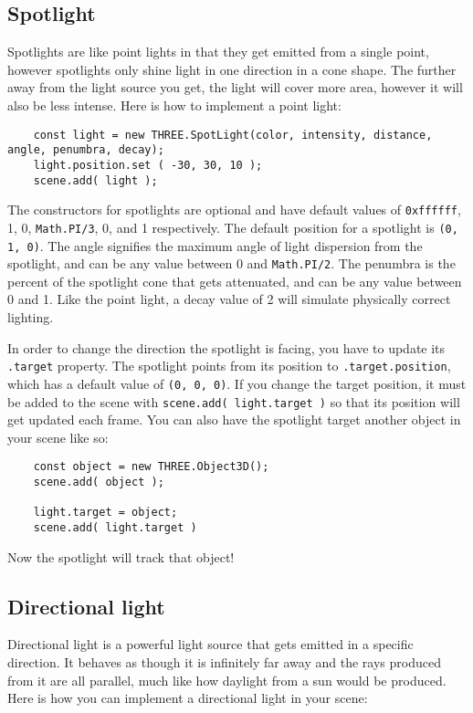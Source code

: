 \documentclass[10pt,final,journal,compsoc]{IEEEtran}
\begin{document}
    \subsection{Spotlight}
    Spotlights are like point lights in that they get emitted from a single point, however spotlights only shine light in one direction in a cone shape. The further away from the light source you get, the light will cover more area, however it will also be less intense. Here is how to implement a point light:
    
    \begin{lstlisting}
    const light = new THREE.SpotLight(color, intensity, distance, angle, penumbra, decay);
    light.position.set ( -30, 30, 10 );
    scene.add( light );
    \end{lstlisting}
    
    The constructors for spotlights are optional and have default values of \verb|0xffffff|, 1, 0, \verb|Math.PI/3|, 0, and 1 respectively. The default position for a spotlight is \verb|(0, 1, 0)|. The angle signifies the maximum angle of light dispersion from the spotlight, and can be any value between 0 and \verb|Math.PI/2|. The penumbra is the percent of the spotlight cone that gets attenuated, and can be any value between 0 and 1. Like the point light, a decay value of 2 will simulate physically correct lighting.
    
    In order to change the direction the spotlight is facing, you have to update its \verb|.target| property. The spotlight points from its position to \verb|.target.position|, which has a default value of \verb|(0, 0, 0)|. If you change the target position, it must be added to the scene with \verb|scene.add( light.target )| so that its position will get updated each frame. You can also have the spotlight target another object in your scene like so:
    
    \begin{lstlisting}
    const object = new THREE.Object3D();
    scene.add( object );
    
    light.target = object;
    scene.add( light.target )
    \end{lstlisting}
    
    Now the spotlight will track that object!
    
    \subsection{Directional light}
    Directional light is a powerful light source that gets emitted in a specific direction. It behaves as though it is infinitely far away and the rays produced from it are all parallel, much like how daylight from a sun would be produced. Here is how you can implement a directional light in your scene:
    
\end{document}
